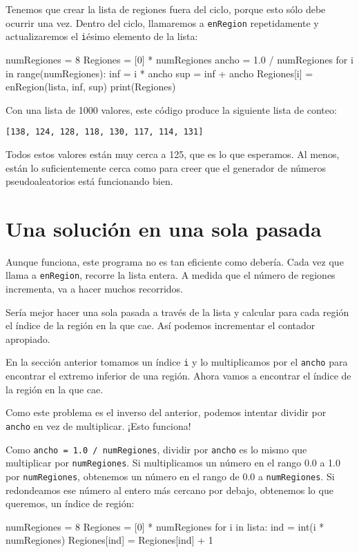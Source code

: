 Tenemos que crear la lista de regiones fuera del ciclo, porque esto
sólo debe ocurrir una vez. Dentro del ciclo, llamaremos a \texttt{enRegion}
repetidamente y actualizaremos el \texttt{i}ésimo elemento de la lista:

\pagebreak

\begin{pythoncode}
numRegiones = 8
Regiones = [0] * numRegiones
ancho = 1.0 / numRegiones
for i in range(numRegiones):
  inf = i * ancho
  sup = inf + ancho
  Regiones[i] = enRegion(lista, inf, sup)
print(Regiones)
\end{pythoncode}

Con una lista de 1000 valores, este código produce la siguiente lista
de conteo:
\begin{verbatim}
[138, 124, 128, 118, 130, 117, 114, 131]
\end{verbatim}
Todos estos valores están muy cerca a 125, que es lo que esperamos.
Al menos, están lo suficientemente cerca como para creer que el generador
de números pseudoaleatorios está funcionando bien.

\section{Una solución en una sola pasada}

\label{histograma} 

Aunque funciona, este programa no es tan eficiente como debería. Cada
vez que llama a \texttt{enRegion}, recorre la lista entera. A medida
que el número de regiones incrementa, va a hacer muchos recorridos.

Sería mejor hacer una sola pasada a través de la lista y calcular
para cada región el índice de la región en la que cae. Así podemos
incrementar el contador apropiado.

En la sección anterior tomamos un índice \texttt{i} y lo multiplicamos
por el \texttt{ancho} para encontrar el extremo inferior de una región.
Ahora vamos a encontrar el índice de la región en la que cae.

Como este problema es el inverso del anterior, podemos intentar dividir
por \texttt{ancho} en vez de multiplicar. ¡Esto funciona!

Como \texttt{ancho = 1.0 / numRegiones}, dividir por \texttt{ancho}
es lo mismo que multiplicar por \texttt{numRegiones}. Si multiplicamos
un número en el rango 0.0 a 1.0 por \texttt{numRegiones}, obtenemos
un número en el rango de 0.0 a \texttt{numRegiones}. Si redondeamos
ese número al entero más cercano por debajo, obtenemos lo que queremos,
un índice de región:
\begin{pythoncode}
numRegiones = 8
Regiones = [0] * numRegiones
for i in lista:
  ind = int(i * numRegiones)
  Regiones[ind] = Regiones[ind] + 1
\end{pythoncode}

